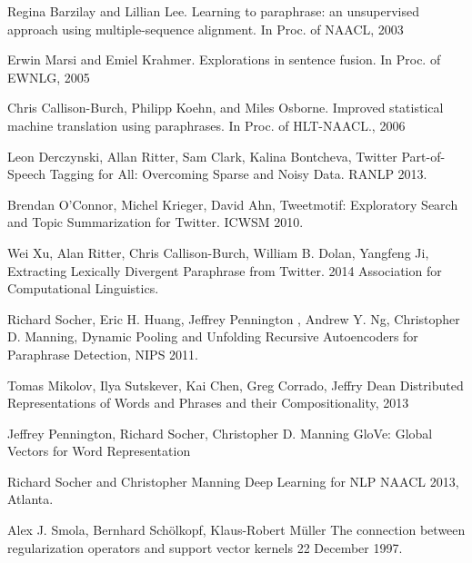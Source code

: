 \documentclass[conference]{IEEEtran}
\begin{document}
%
%
%
\begin{thebibliography}{1}
Regina Barzilay and Lillian Lee.
Learning to paraphrase: an unsupervised approach using multiple-sequence alignment. 
In Proc. of NAACL, 2003

Erwin Marsi and Emiel Krahmer.
Explorations in sentence fusion. 
In Proc. of EWNLG, 2005

Chris Callison-Burch, Philipp Koehn, and Miles Osborne.
Improved statistical machine translation using paraphrases. 
In Proc. of HLT-NAACL., 2006

Leon Derczynski, Allan Ritter, Sam Clark, Kalina Bontcheva, 
Twitter Part-of-Speech Tagging for All: Overcoming Sparse and Noisy Data.
RANLP 2013.

Brendan O’Connor, Michel Krieger, David Ahn,
Tweetmotif: Exploratory Search and Topic Summarization for Twitter.
ICWSM 2010.

Wei Xu, Alan Ritter, Chris Callison-Burch, William B. Dolan, Yangfeng Ji, 
Extracting Lexically Divergent Paraphrase from Twitter. 
2014 Association for Computational Linguistics.

Richard Socher, Eric H. Huang, Jeffrey Pennington
, Andrew Y. Ng, Christopher D. Manning, Dynamic Pooling and Unfolding Recursive
Autoencoders for Paraphrase Detection, NIPS 2011.

Tomas Mikolov, Ilya Sutskever, Kai Chen,
Greg Corrado, Jeffry Dean
Distributed Representations of Words and Phrases
and their Compositionality, 2013

Jeffrey Pennington, Richard Socher, Christopher D. Manning
GloVe: Global Vectors for Word Representation

Richard Socher and Christopher Manning
Deep	 Learning for NLP
NAACL 2013, Atlanta.

Alex J. Smola, Bernhard Sch{\"o}lkopf, Klaus-Robert M{\"u}ller
The connection between regularization operators and support vector kernels
 22 December 1997.


\end{thebibliography}
\end{document}
